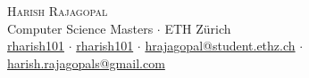 \newcommand{\sep}{$\cdot$}%
\newcommand{\gmail}{harish.rajagopals@gmail.com}
\newcommand{\ethzmail}{hrajagopal@student.ethz.ch}

\begin{center}

\color{headings}
\textsc{\huge Harish Rajagopal}\\[2mm]
Computer Science Masters \sep{} ETH Zürich\\[1mm]
\faGithub{} \href{https://github.com/rharish101}{rharish101} \sep{}
\faLinkedin{} \href{https://www.linkedin.com/in/rharish101/}{rharish101} \sep{}
\faEnvelope{} \href{mailto:\ethzmail}{\ethzmail} \sep{}
\faEnvelope{} \href{mailto:\gmail}{\gmail}

\end{center}
